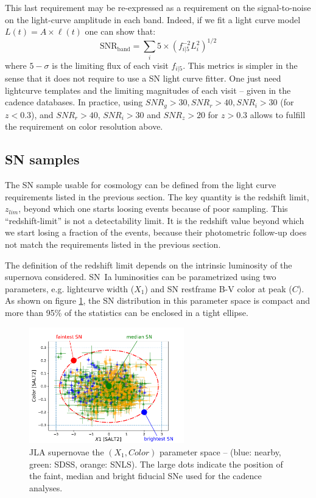 \documentclass [11pt,a4paper]{article}
\begin{document}
This last requirement may be re-expressed as a requirement on the
signal-to-noise on the light-curve amplitude in each band. Indeed, if
we fit a light curve model $L(t) = A \times \ell(t)$ one can show
that:
\begin{equation}
\mathrm{SNR_{band}} = \sum_{i} 5 \times (f^{-2}_{i|5} L_i^2)^{1/2}\label{eqn:snr}
\end{equation} 
where $5-\sigma$ is the limiting flux of each visit $f_{i|5}$.  This
metrics is simpler in the sense that it does not require to use a SN
light curve fitter. One just need lightcurve templates and the
limiting magnitudes of each visit -- given in the cadence
databases. In practice, using $SNR_g > 30, SNR_r > 40, SNR_i > 30$
(for $z<0.3$), and $SNR_r > 40$, $SNR_i > 30$ and $SNR_z > 20$ for
$z>0.3$ allows to fulfill the requirement on color resolution above.


\subsection{SN samples}

The SN sample usable for cosmology can be defined from the light curve
requirements listed in the previous section. The key quantity is the
redshift limit, $z_{lim}$, beyond which one starts loosing events
because of poor sampling.  This ``redshift-limit'' is not a
detectability limit.  It is the redshift value beyond which we start
losing a fraction of the events, because their photometric follow-up
does not match the requirements listed in the previous section.

The definition of the redshift limit depends on the intrinsic
luminosity of the supernova considered.  SN~Ia luminosities can be
parametrized using two parameters, e.g. lightcurve width ($X_1$) and
SN restframe B-V color at peak ($C$).  As shown on figure
\ref{fig:jla_X1_C}, the SN distribution in this parameter space is
compact and more than 95\% of the statistics can be enclosed in a
tight ellipse. 

\begin{figure}
  \begin{center}
    \includegraphics[width=0.6\textwidth]{Figures/sn_parameter_space.pdf}
    \caption{JLA supernovae the $(X_1,Color)$ parameter space --
      (blue: nearby, green: SDSS, orange: SNLS).  The large dots
      indicate the position of the faint, median and bright fiducial
      SNe used for the cadence analyses.}
    \label{fig:jla_X1_C}
  \end{center}
\end{figure}
\end{document}

